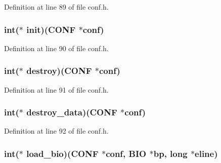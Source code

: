 Definition at line 89 of file conf.\+h.

\subsubsection[{\texorpdfstring{init}{init}}]{\setlength{\rightskip}{0pt plus 5cm}int($\ast$ init)({\bf C\+O\+NF} $\ast$conf)}\hypertarget{structconf__method__st_aa0e0f4791abf370d6be68caba8aa10e5}{}\label{structconf__method__st_aa0e0f4791abf370d6be68caba8aa10e5}


Definition at line 90 of file conf.\+h.

\subsubsection[{\texorpdfstring{destroy}{destroy}}]{\setlength{\rightskip}{0pt plus 5cm}int($\ast$ destroy)({\bf C\+O\+NF} $\ast$conf)}\hypertarget{structconf__method__st_ac5ae49e4cf00c4babd1ca0856eae887f}{}\label{structconf__method__st_ac5ae49e4cf00c4babd1ca0856eae887f}


Definition at line 91 of file conf.\+h.

\subsubsection[{\texorpdfstring{destroy\+\_\+data}{destroy_data}}]{\setlength{\rightskip}{0pt plus 5cm}int($\ast$ destroy\+\_\+data)({\bf C\+O\+NF} $\ast$conf)}\hypertarget{structconf__method__st_ab26bafbc683c2d302af32da8c302148f}{}\label{structconf__method__st_ab26bafbc683c2d302af32da8c302148f}


Definition at line 92 of file conf.\+h.

\subsubsection[{\texorpdfstring{load\+\_\+bio}{load_bio}}]{\setlength{\rightskip}{0pt plus 5cm}int($\ast$ load\+\_\+bio)({\bf C\+O\+NF} $\ast$conf, {\bf B\+IO} $\ast${\bf bp}, long $\ast${\bf eline})}\hypertarget{structconf__method__st_a81743c52fe3cb06880a39ee2dc93f08e}{}\label{structconf__method__st_a81743c52fe3cb06880a39ee2dc93f08e}


